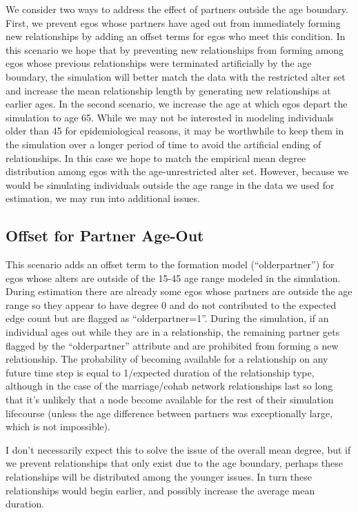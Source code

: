 \documentclass [11pt, proquest] {uwthesis}[2015/03/03]
\begin{document}
We consider two ways to address the effect of partners outside the age
boundary. First, we prevent egos whose partners have aged out from
immediately forming new relationships by adding an offset terms for egos
who meet this condition. In this scenario we hope that by preventing new
relationships from forming among egos whose previous relationships were
terminated artificially by the age boundary, the simulation will better
match the data with the restricted alter set and increase the mean
relationship length by generating new relationships at earlier ages. In
the second scenario, we increase the age at which egos depart the
simulation to age 65. While we may not be interested in modeling
individuals older than 45 for epidemiological reasons, it may be
worthwhile to keep them in the simulation over a longer period of time
to avoid the artificial ending of relationships. In this case we hope to
match the empirical mean degree distribution among egos with the
age-unrestricted alter set. However, because we would be simulating
individuals outside the age range in the data we used for estimation, we
may run into additional issues.

\subsection{Offset for Partner
Age-Out}\label{offset-for-partner-age-out}

This scenario adds an offset term to the formation model
(``olderpartner'') for egos whose alters are outside of the 15-45 age
range modeled in the simulation. During estimation there are already
some egos whose partners are outside the age range so they appear to
have degree 0 and do not contributed to the expected edge count but are
flagged as ``olderpartner=1''. During the simulation, if an individual
ages out while they are in a relationship, the remaining partner gets
flagged by the ``olderpartner'' attribute and are prohibited from
forming a new relationship. The probability of becoming available for a
relationship on any future time step is equal to 1/expected duration of
the relationship type, although in the case of the marriage/cohab
network relationships last so long that it's unlikely that a node become
available for the rest of their simulation lifecourse (unless the age
difference between partners was exceptionally large, which is not
impossible).

I don't necessarily expect this to solve the issue of the overall mean
degree, but if we prevent relationships that only exist due to the age
boundary, perhaps these relationships will be distributed among the
younger issues. In turn these relationships would begin earlier, and
possibly increase the average mean duration.
\end{document}
